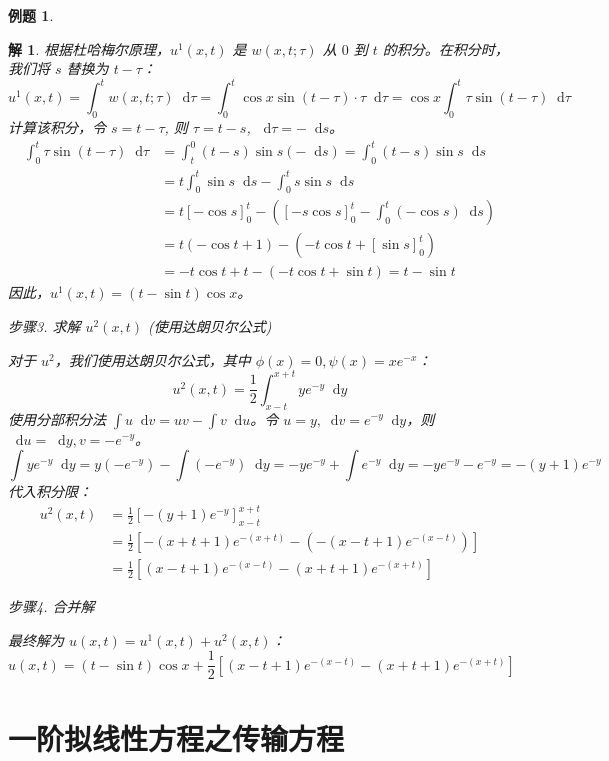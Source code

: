 \documentclass[12pt,a4paper]{article}
\newcommand{\diff}{\mathop{}\!\mathrm{d}}
\numberwithin{subsection}{section}
\numberwithin{subsubsection}{subsection}
\theoremstyle{plain}
\newtheorem{solution}{解}[subsection]
\theoremstyle{definition}
\newtheorem{example}{例题}[subsection]
\theoremstyle{remark}
\begin{document}
\begin{example}
\begin{solution}
		\noindent
		根据杜哈梅尔原理，$u^1(x,t)$ 是 $w(x,t;\tau)$ 从 $0$ 到 $t$ 的积分。在积分时，我们将 $s$ 替换为 $t-\tau$：
		\[
		u^1(x,t) = \int_0^t w(x,t;\tau) \diff \tau = \int_0^t \cos x \sin(t-\tau) \cdot \tau \diff \tau = \cos x \int_0^t \tau \sin(t-\tau) \diff \tau
		\]
		计算该积分，令 $s = t-\tau$, 则 $\tau = t-s$, $\diff \tau = -\diff s$。
		\begin{align*}
			\int_0^t \tau \sin(t-\tau) \diff \tau &= \int_t^0 (t-s)\sin s (-\diff s) = \int_0^t (t-s)\sin s \diff s \\
			&= t \int_0^t \sin s \diff s - \int_0^t s\sin s \diff s \\
			&= t [-\cos s]_0^t - \left( [-s\cos s]_0^t - \int_0^t (-\cos s) \diff s \right) \\
			&= t(-\cos t + 1) - \left( -t\cos t + [\sin s]_0^t \right) \\
			&= -t\cos t + t - (-t\cos t + \sin t) = t - \sin t
		\end{align*}
		因此，$u^1(x,t) = (t-\sin t)\cos x$。
		
	
		
	步骤3. 求解 $u^2(x,t)$ (使用达朗贝尔公式)
		
		\noindent
		对于 $u^2$，我们使用达朗贝尔公式，其中 $\phi(x)=0, \psi(x)=xe^{-x}$：
		\[
		u^2(x,t) = \frac{1}{2} \int_{x-t}^{x+t} y e^{-y} \diff y
		\]
		使用分部积分法 $\int u \diff v = uv - \int v \diff u$。令 $u=y, \diff v = e^{-y}\diff y$，则 $\diff u = \diff y, v = -e^{-y}$。
		\[
		\int y e^{-y} \diff y = y(-e^{-y}) - \int (-e^{-y}) \diff y = -y e^{-y} + \int e^{-y} \diff y = -y e^{-y} - e^{-y} = -(y+1)e^{-y}
		\]
		代入积分限：
		\begin{align*}
			u^2(x,t) &= \frac{1}{2} \left[ -(y+1)e^{-y} \right]_{x-t}^{x+t} \\
			&= \frac{1}{2} \left[ -(x+t+1)e^{-(x+t)} - (-(x-t+1)e^{-(x-t)}) \right] \\
			&= \frac{1}{2} \left[ (x-t+1)e^{-(x-t)} - (x+t+1)e^{-(x+t)} \right]
		\end{align*}
		
	步骤4. 合并解
		
		\noindent
		最终解为 $u(x,t) = u^1(x,t) + u^2(x,t)$：
		\[
		u(x,t) = (t-\sin t)\cos x + \frac{1}{2} \left[ (x-t+1)e^{-(x-t)} - (x+t+1)e^{-(x+t)} \right]
		\]
		\end{solution}
	\end{example}

	
	
	
	
	
	\newpage
	\section{一阶拟线性方程之传输方程} 
\end{document}
